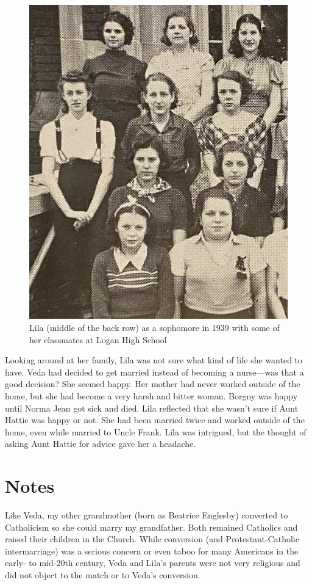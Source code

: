 \documentclass[
  letterpaper,
]{book}
\begin{document}
\begin{figure}[H]

{\centering \includegraphics[width=0.7\linewidth,height=\textheight,keepaspectratio]{images/Akou12.jpg}

}

\caption[Lila as a sophomore in 1939 with some of her classmates at
Logan High School]{Lila (middle of the back row) as a sophomore in 1939
with some of her classmates at Logan High School}

\end{figure}%

Looking around at her family, Lila was not sure what kind of life she
wanted to have. Veda had decided to get married instead of becoming a
nurse---was that a good decision? She seemed happy. Her mother had never
worked outside of the home, but she had become a very harsh and bitter
woman. Borgny was happy until Norma Jean got sick and died. Lila
reflected that she wasn't sure if Aunt Hattie was happy or not. She had
been married twice and worked outside of the home, even while married to
Uncle Frank. Lila was intrigued, but the thought of asking Aunt Hattie
for advice gave her a headache.

\section{Notes}\label{notes-22}

Like Veda, my other grandmother (born as Beatrice Englesby) converted to
Catholicism so she could marry my grandfather. Both remained Catholics
and raised their children in the Church. While conversion (and
Protestant-Catholic intermarriage) was a serious concern or even taboo
for many Americans in the early- to mid-20th century, Veda and Lila's
parents were not very religious and did not object to the match or to
Veda's conversion.
\end{document}
